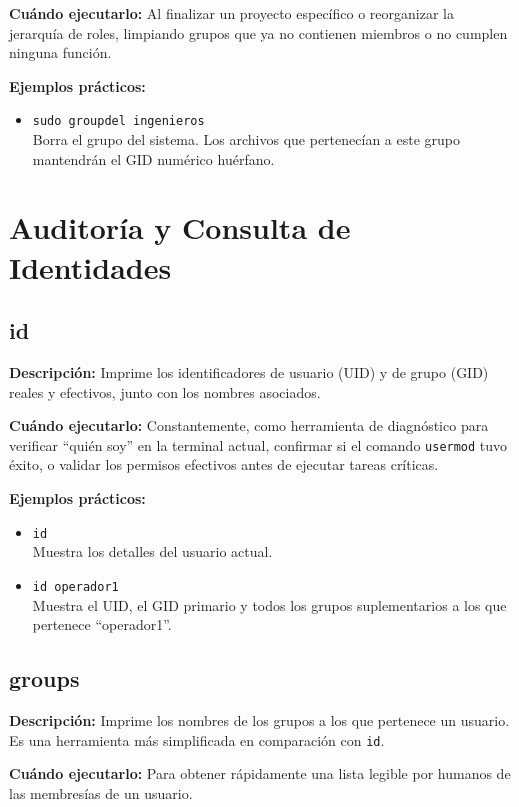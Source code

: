 \documentclass[11pt, a4paper]{article}
\begin{document}
\textbf{Cuándo ejecutarlo:} Al finalizar un proyecto específico o reorganizar la jerarquía de roles, limpiando grupos que ya no contienen miembros o no cumplen ninguna función.

\textbf{Ejemplos prácticos:}
\begin{itemize}
    \item \texttt{sudo groupdel ingenieros} \\
    Borra el grupo del sistema. Los archivos que pertenecían a este grupo mantendrán el GID numérico huérfano.
\end{itemize}

\section{Auditoría y Consulta de Identidades}

\subsection{id}
\textbf{Descripción:} Imprime los identificadores de usuario (UID) y de grupo (GID) reales y efectivos, junto con los nombres asociados.

\textbf{Cuándo ejecutarlo:} Constantemente, como herramienta de diagnóstico para verificar ``quién soy'' en la terminal actual, confirmar si el comando \texttt{usermod} tuvo éxito, o validar los permisos efectivos antes de ejecutar tareas críticas.

\textbf{Ejemplos prácticos:}
\begin{itemize}
    \item \texttt{id} \\
    Muestra los detalles del usuario actual.
    \item \texttt{id operador1} \\
    Muestra el UID, el GID primario y todos los grupos suplementarios a los que pertenece ``operador1''.
\end{itemize}

\subsection{groups}
\textbf{Descripción:} Imprime los nombres de los grupos a los que pertenece un usuario. Es una herramienta más simplificada en comparación con \texttt{id}.

\textbf{Cuándo ejecutarlo:} Para obtener rápidamente una lista legible por humanos de las membresías de un usuario.
\end{document}
